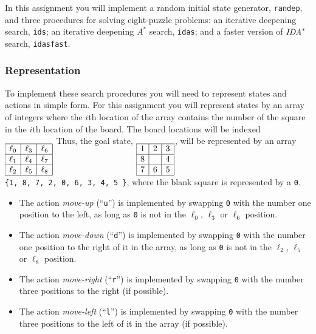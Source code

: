 \documentclass[12pt]{article}
\begin{document}
\noindent
In this assignment you will implement 
a random initial state generator, {\tt randep},
and three procedures for solving eight-puzzle problems:
an iterative deepening search, {\tt ids};
an iterative deepening $A^*$ search, {\tt idas};
and a faster version of $\mbox{\it IDA}^*$ search, {\tt idasfast}.

\subsubsection*{Representation}
To implement these search procedures you will need to represent
states and actions in simple form.
For this assignment you will represent states by an array of integers
where the $i$th location of the array contains the number of the
square in the $i$th location of the board. 
The board locations will be indexed
%
$\begin{array}[t]{|c|c|c|}\hline
{\ell}_0 & {\ell}_3 & {\ell}_6 \\\hline
{\ell}_1 & {\ell}_4 & {\ell}_7 \\\hline
{\ell}_2 & {\ell}_5 & {\ell}_8 \\\hline
\end{array}$
Thus, the goal state,
$\begin{array}[t]{|c|c|c|}\hline
1 & 2 & 3 \\\hline
8 &   & 4 \\\hline
7 & 6 & 5 \\\hline
\end{array}$,
will be represented by an array {\tt \{1, 8, 7, 2, 0, 6, 3, 4, 5 \}},
where
the blank square is represented by a {\tt 0}.

\begin{itemize}
\item
The action {\em move-up\/} (``{\tt u}'') is implemented by swapping {\tt 0} 
with
the number one position to the left, as long as
{\tt 0} is not in the $\ell_0$, $\ell_3$ or $\ell_6$ position.
\item
The action {\em move-down\/} (``{\tt d}'') is implemented by swapping {\tt 0} 
with
the number one position to the right of it in the array, as long as
{\tt 0} is not in the $\ell_2$, $\ell_5$ or $\ell_8$ position.
\item
The action {\em move-right\/} (``{\tt r}'') is implemented by swapping {\tt 0} 
with
the number three positions to the right (if possible).
\item
The action {\em move-left\/} (``{\tt l}'') is implemented by swapping {\tt 0} 
with
the number three positions to the left of it in the array (if possible).
\end{itemize}
\end{document}
